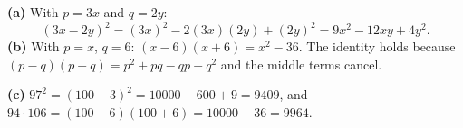 \textbf{(a)} With $p=3x$ and $q=2y$:
\[
(3x-2y)^2=(3x)^2-2(3x)(2y)+(2y)^2=\boxed{9x^2-12xy+4y^2}.
\]
\textbf{(b)} With $p=x$, $q=6$: $(x-6)(x+6)=\boxed{x^2-36}$. The identity holds because $(p-q)(p+q)=p^2+pq-qp-q^2$ and the middle terms cancel.

\textbf{(c)} $97^2=(100-3)^2=10000-600+9=\boxed{9409}$, and $94\cdot106=(100-6)(100+6)=10000-36=\boxed{9964}$.
